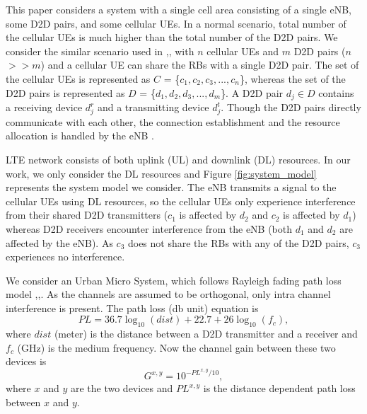 \documentclass[times]{dacauth}
\begin{document}
\noindent
This paper considers a system with a single cell area consisting of a single eNB, some D2D pairs, and some cellular UEs. 
In a normal scenario, total number of the cellular UEs is much higher than the total number of the D2D pairs. We consider the similar scenario used in \cite{lora},\cite{zulhasnine},\cite{dara} with $n$ cellular UEs and $m$ D2D pairs ($n$$>>$$m$) and a cellular UE can share the RBs with a single D2D pair.
The set of the cellular UEs is represented as $C$ = \{$ c_{1}, c_{2}, c_{3}, ..., c_{n} $\},  
whereas the set of the D2D pairs is represented as $D$ = \{$ d_{1}, d_{2}, d_{3}, ..., d_{m} $\}. 
A D2D pair $d_{j} \in D$ contains a receiving device $d_j^r$ and a transmitting device $d_j^t$. Though the D2D pairs directly communicate with each other, the connection establishment and the resource allocation is handled by the eNB \cite{dara}. 

\smallskip
\noindent
LTE network consists of both uplink (UL) and downlink (DL) resources. In our work, we only consider the DL resources  and Figure \ref{fig:system_model} represents the system model we consider. The eNB transmits a signal to the cellular UEs using DL resources, so the cellular UEs only experience interference from their shared D2D transmitters ($c_1$ is affected by $d_2$ and $c_2$ is affected by $d_1$) whereas D2D receivers encounter interference from the eNB (both $d_1$ and $d_2$ are affected by the eNB). As $c_3$ does not share the RBs with any of the D2D pairs, $c_3$ experiences no interference.

\smallskip
\noindent
We consider an Urban Micro System, which follows Rayleigh fading path loss model \cite{lora},\cite{zulhasnine},\cite{dara}. As the channels are assumed to be orthogonal, only intra channel interference is present. The path loss (db unit) equation is 
\begin{equation}
	PL = 36.7\log_{10}(dist)+22.7+26\log_{10}(f_{c}),
\end{equation}
where $dist$ (meter) is the distance between a D2D transmitter and a receiver and $f_{c}$ (GHz) is the medium frequency.
Now the channel gain between these two devices is 
\begin{equation}
	G^{x,y} = 10^{-PL^{x,y}/10},
\end{equation}
where $x$ and $y$ are the two devices and $PL^{x,y}$ is the distance dependent path loss between $x$ and $y$.
\end{document}
